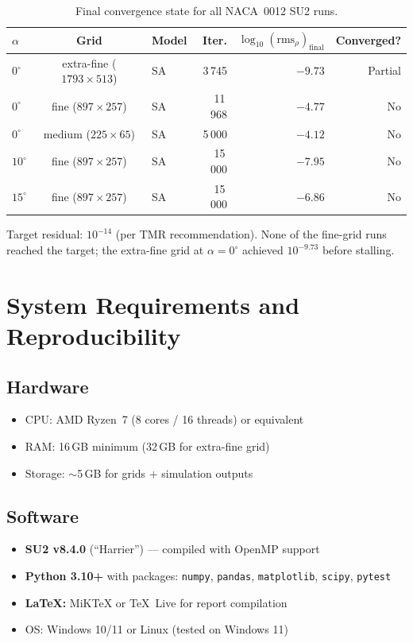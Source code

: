 \documentclass[11pt,a4paper]{article}
\begin{document}
\begin{table}[!ht]
\centering
\caption{Final convergence state for all NACA~0012 SU2 runs.}
\label{tab:conv_data}
\begin{tabular}{lclrrr}
\toprule
\textbf{$\alpha$} & \textbf{Grid} & \textbf{Model} &
  \textbf{Iter.} & \textbf{$\log_{10}(\text{rms}_\rho)_\text{final}$} &
  \textbf{Converged?} \\
\midrule
$0^\circ$  & extra-fine ($1793\times513$) & SA & 3\,745  & $-9.73$ & Partial \\
$0^\circ$  & fine ($897\times257$)        & SA & 11\,968 & $-4.77$ & No \\
$0^\circ$  & medium ($225\times65$)       & SA & 5\,000  & $-4.12$ & No \\
$10^\circ$ & fine ($897\times257$)        & SA & 15\,000 & $-7.95$ & No \\
$15^\circ$ & fine ($897\times257$)        & SA & 15\,000 & $-6.86$ & No \\
\bottomrule
\end{tabular}

\medskip\footnotesize
Target residual: $10^{-14}$ (per TMR recommendation).
None of the fine-grid runs reached the target; the extra-fine grid at
$\alpha=0^\circ$ achieved $10^{-9.73}$ before stalling.
\end{table}

\section{System Requirements and Reproducibility}
\label{app:system}

\subsection*{Hardware}
\begin{itemize}
  \item CPU: AMD Ryzen~7 (8 cores / 16 threads) or equivalent
  \item RAM: 16\,GB minimum (32\,GB for extra-fine grid)
  \item Storage: $\sim$5\,GB for grids + simulation outputs
\end{itemize}

\subsection*{Software}
\begin{itemize}
  \item \textbf{SU2 v8.4.0} (``Harrier'') — compiled with OpenMP support
  \item \textbf{Python 3.10+} with packages:
    \texttt{numpy}, \texttt{pandas}, \texttt{matplotlib},
    \texttt{scipy}, \texttt{pytest}
  \item \textbf{\LaTeX:} MiKTeX or TeX~Live for report compilation
  \item OS: Windows 10/11 or Linux (tested on Windows 11)
\end{itemize}
\end{document}

